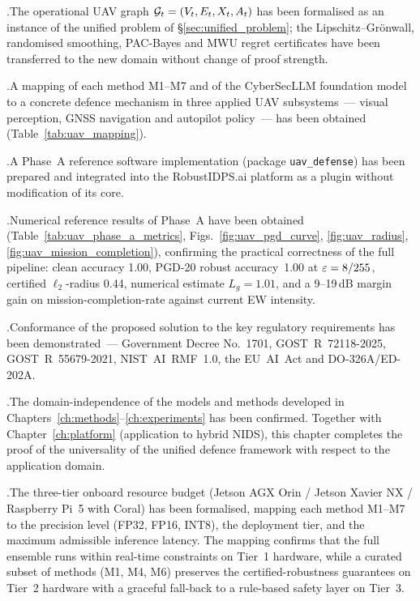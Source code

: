 .\quad The operational UAV graph
$\mathcal{G}_t = (V_t,E_t,X_t,A_t)$ has been formalised as an instance of
the unified problem of \S\ref{sec:unified_problem}; the
Lipschitz--Grönwall, randomised smoothing, PAC-Bayes and MWU regret
certificates have been transferred to the new domain without change
of proof strength.

.\quad A mapping of each method
\textsf{M1}--\textsf{M7} and of the \textsf{CyberSecLLM} foundation
model to a concrete defence mechanism in three applied UAV
subsystems~--- visual perception, GNSS navigation and autopilot
policy~--- has been obtained (Table~\ref{tab:uav_mapping}).

.\quad A Phase~A reference software implementation
(package \texttt{uav\_defense}) has been prepared and integrated into
the \textsf{RobustIDPS.ai} platform as a plugin without modification
of its core.

.\quad Numerical reference results of Phase~A have been
obtained (Table~\ref{tab:uav_phase_a_metrics},
Figs.~\ref{fig:uav_pgd_curve}, \ref{fig:uav_radius},
\ref{fig:uav_mission_completion}), confirming the practical
correctness of the full pipeline: clean accuracy 1.00, PGD-20 robust
accuracy~1.00 at $\varepsilon=8/255$, certified $\ell_2$-radius 0.44,
numerical estimate $L_g=1.01$, and a 9--19\,dB margin gain on
mission-completion-rate against current EW intensity.

.\quad Conformance of the proposed solution to the key
regulatory requirements has been demonstrated~--- Government Decree
No.~1701, \mbox{GOST~R~72118-2025}, \mbox{GOST~R~55679-2021},
\mbox{NIST~AI~RMF~1.0}, the \mbox{EU~AI~Act} and
\mbox{DO-326A/ED-202A}.

.\quad The domain-independence of the models and methods
developed in Chapters~\ref{ch:methods}--\ref{ch:experiments} has been
confirmed. Together with Chapter~\ref{ch:platform} (application to
hybrid NIDS), this chapter completes the proof of the universality of
the unified defence framework with respect to the application domain.

.\quad The three-tier onboard resource budget (Jetson AGX
Orin / Jetson Xavier NX / Raspberry Pi~5 with Coral) has been
formalised, mapping each method M1--M7 to the precision level (FP32,
FP16, INT8), the deployment tier, and the maximum admissible
inference latency. The mapping confirms that the full ensemble runs
within real-time constraints on Tier~1 hardware, while a curated
subset of methods (M1, M4, M6) preserves the certified-robustness
guarantees on Tier~2 hardware with a graceful fall-back to a
rule-based safety layer on Tier~3.

